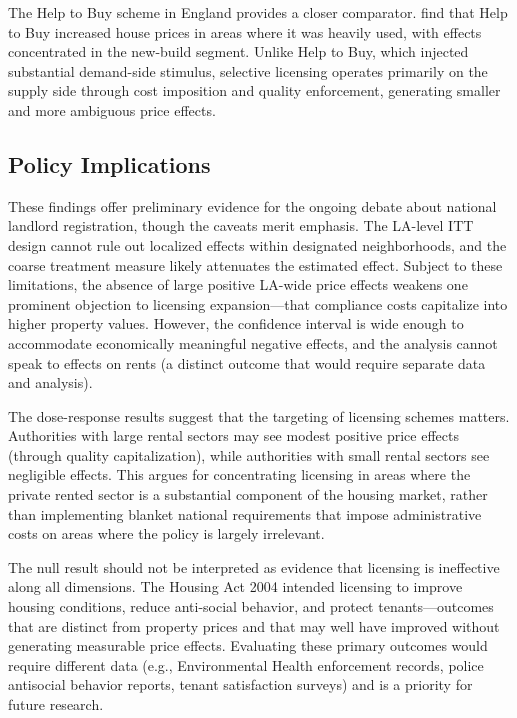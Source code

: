 \documentclass[12pt]{article}
\begin{document}
The Help to Buy scheme in England provides a closer comparator. \citet{carozzi2024help} find that Help to Buy increased house prices in areas where it was heavily used, with effects concentrated in the new-build segment. Unlike Help to Buy, which injected substantial demand-side stimulus, selective licensing operates primarily on the supply side through cost imposition and quality enforcement, generating smaller and more ambiguous price effects.

\subsection{Policy Implications}

These findings offer preliminary evidence for the ongoing debate about national landlord registration, though the caveats merit emphasis. The LA-level ITT design cannot rule out localized effects within designated neighborhoods, and the coarse treatment measure likely attenuates the estimated effect. Subject to these limitations, the absence of large positive LA-wide price effects weakens one prominent objection to licensing expansion---that compliance costs capitalize into higher property values. However, the confidence interval is wide enough to accommodate economically meaningful negative effects, and the analysis cannot speak to effects on rents (a distinct outcome that would require separate data and analysis).

The dose-response results suggest that the targeting of licensing schemes matters. Authorities with large rental sectors may see modest positive price effects (through quality capitalization), while authorities with small rental sectors see negligible effects. This argues for concentrating licensing in areas where the private rented sector is a substantial component of the housing market, rather than implementing blanket national requirements that impose administrative costs on areas where the policy is largely irrelevant.

The null result should not be interpreted as evidence that licensing is ineffective along all dimensions. The Housing Act 2004 intended licensing to improve housing conditions, reduce anti-social behavior, and protect tenants---outcomes that are distinct from property prices and that may well have improved without generating measurable price effects. Evaluating these primary outcomes would require different data (e.g., Environmental Health enforcement records, police antisocial behavior reports, tenant satisfaction surveys) and is a priority for future research.
\end{document}
